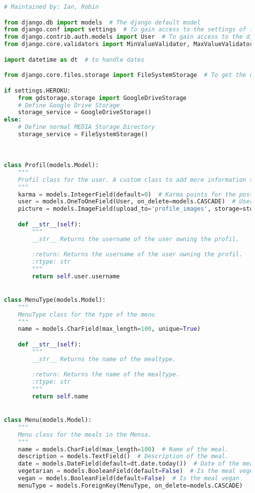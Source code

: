 \begin{lstlisting}[language=Python]
# Maintained by: Ian, Robin

from django.db import models  # The django default model
from django.conf import settings  # To gain access to the settings of the app
from django.contrib.auth.models import User  # To gain access to the django internal user
from django.core.validators import MinValueValidator, MaxValueValidator  # For the Rating to validate if the rating is in the range of 1-5

import datetime as dt  # to handle dates

from django.core.files.storage import FileSystemStorage  # To get the default storage service from django

if settings.HEROKU:
    from gdstorage.storage import GoogleDriveStorage
    # Define Google Drive Storage
    storage_service = GoogleDriveStorage()
else:
    # Define normal MEDIA Storage Directory
    storage_service = FileSystemStorage()
    


class Profil(models.Model):
    """
    Profil class for the user. A custom class to add more information to the user.
    """
    karma = models.IntegerField(default=0)  # Karma points for the posts from the user. 
    user = models.OneToOneField(User, on_delete=models.CASCADE)  # User linked to the profil. -> The profil is deleted when the user is deleted.
    picture = models.ImageField(upload_to='profile_images', storage=storage_service, blank=True, null=True)  # Image of the user.

    def __str__(self):
        """
        __str__ Returns the username of the user owning the profil.

        :return: Returns the username of the user owning the profil.
        :rtype: str
        """
        return self.user.username


class MenuType(models.Model):
    """
    MenuType class for the type of the menu
    """
    name = models.CharField(max_length=100, unique=True)

    def __str__(self):
        """
        __str__ Returns the name of the mealtype.

        :return: Returns the name of the mealtype.
        :rtype: str
        """
        return self.name


class Menu(models.Model):
    """
    Menu class for the meals in the Mensa.
    """
    name = models.CharField(max_length=100)  # Name of the meal.
    description = models.TextField()  # Description of the meal.
    date = models.DateField(default=dt.date.today())  # Date of the meal. Default is the current date.
    vegetarian = models.BooleanField(default=False)  # Is the meal vegetarian?
    vegan = models.BooleanField(default=False)  # Is the meal vegan
    menuType = models.ForeignKey(MenuType, on_delete=models.CASCADE)


\end{lstlisting}
